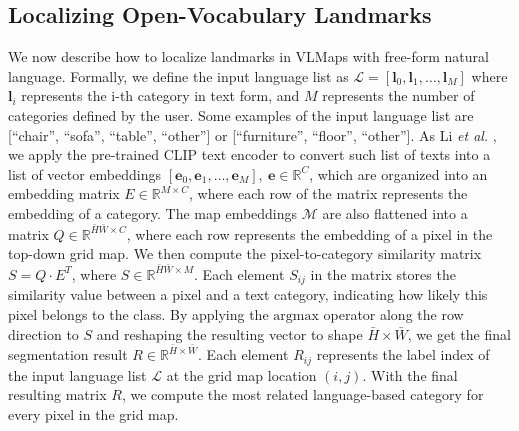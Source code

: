 \documentclass[letterpaper, 10 pt, conference]{ieeeconf}  %
\begin{document}
\subsection{Localizing Open-Vocabulary Landmarks}
\label{sec:sub_landmark_indexing}
We now describe how to localize landmarks in VLMaps with free-form natural language.
Formally, we define the input language list as $\mathcal{L} = [\mathbf{l}_0, \mathbf{l}_1, \ldots, \mathbf{l}_M]$ where $\mathbf{l}_i$ represents the i-th category in text form, and $M$ represents the number of categories defined by the user. Some examples of the input language list are [``chair'', ``sofa'', ``table'', ``other''] or [``furniture'', ``floor'', ``other'']. As Li \emph{et al.} \cite{li2021language}, we apply the pre-trained CLIP text encoder \cite{radford2021learning} to convert such list of texts into a list of vector embeddings $[\mathbf{e}_0, \mathbf{e}_1, \ldots, \mathbf{e}_M],\ \mathbf{e} \in \mathbb{R}^{C}$, which are organized into an embedding matrix $E \in \mathbb{R}^{M \times C}$, where each row of the matrix represents the embedding of a category. The map embeddings $\mathcal{M}$ are also flattened into a matrix $Q \in \mathbb{R}^{\bar{H}\bar{W} \times C}$, where each row represents the embedding of a pixel in the top-down grid map. We then compute the pixel-to-category similarity matrix $S = Q \cdot E^{T}$,
where $S \in \mathbb{R}^{\bar{H}\bar{W} \times M}$. Each element $S_{ij}$ in the matrix stores the similarity value between a pixel and a text category, indicating how likely this pixel belongs to the class. By applying the $\mathrm{argmax}$ operator along the row direction to $S$ and reshaping the resulting vector to shape $\bar{H} \times \bar{W}$, we get the final segmentation result $R \in \mathbb{R}^{\bar{H} \times \bar{W}}$. Each element $R_{ij}$ represents the label index of the input language list $\mathcal{L}$ at the grid map location $(i, j)$. With the final resulting matrix $R$, we compute the most related language-based category for every pixel in the grid map. 
\end{document}
